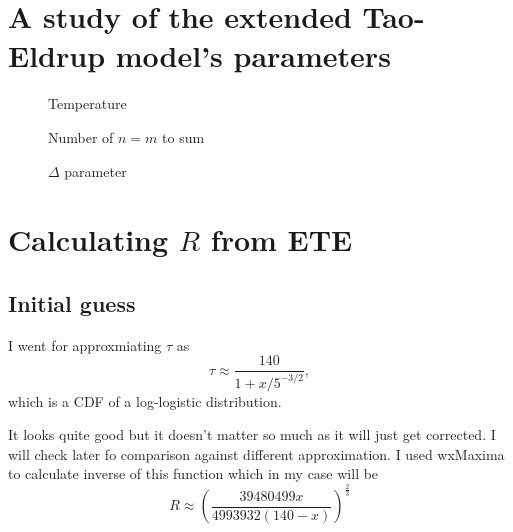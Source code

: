 \documentclass[a4paper]{article}
\begin{document}
	\section{A study of the extended Tao-Eldrup model's parameters}
	\begin{figure}[!ht]
	\centering
	\scalebox{.9}{}
	\caption{Temperature}
	\end{figure}
	\begin{figure}[!ht]
	\centering
	\scalebox{.9}{}
	\caption{Number of $n = m$ to sum}
	\end{figure}
	\begin{figure}[!ht]
	\centering
	\scalebox{.9}{}
	\caption{$\Delta$ parameter}
	\end{figure}
	\section{Calculating $R$ from ETE}
	\subsection{Initial guess}
	I went for approxmiating $\tau$ as 
	\begin{equation}
		\tau \approx \frac{140}{1+x/5^{-3/2}},
	\end{equation}
	which is a CDF of a log-logistic distribution.

	It looks quite good but it doesn't matter so much as
	it will just get corrected.
	I will check later fo comparison against different approximation.
	I used wxMaxima to calculate inverse of this function which in my case
	will be 
	\begin{equation}
		R \approx \left(\frac{39480499x}{4993932(140-x)}\right)^{\textstyle\frac{2}{3}}
	\end{equation}
	
	
\end{document}
